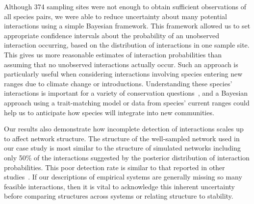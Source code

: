 \documentclass[12pt]{article}
\begin{document}
\begin{spacing}{2.0}
  Although 374 sampling sites were not enough to obtain sufficient observations of all species pairs, we were able to reduce uncertainty about many potential interactions using a simple Bayesian framework. This framework allowed us to set appropriate confidence intervals about the probability of an unobserved interaction occurring, based on the distribution of interactions in one sample site. This gives us more reasonable estimates of interaction probabilities than assuming that no unobserved interactions actually occur. Such an approach is particularly useful when considering interactions involving species entering new ranges due to climate change or introductions. Understanding these species' interactions is important for a variety of conservation questions~\citep{Bartomeus2013,Gravel2013}, and a Bayesian approach using a trait-matching model or data from species' current ranges could help us to anticipate how species will integrate into new communities. 


  Our results also demonstrate how incomplete detection of interactions scales up to affect network structure. The structure of the well-sampled network used in our case study is most similar to the structure of simulated networks including only 50\% of the interactions suggested by the posterior distribution of interaction probabilities. This poor detection rate is similar to that reported in other studies~\citep{Bartomeus2013,Jordano2016,Weinstein2017a}. If our descriptions of empirical systems are generally missing so many feasible interactions, then it is vital to acknowledge this inherent uncertainty before comparing structures across systems or relating structure to stability.



\end{spacing}
\end{document}
